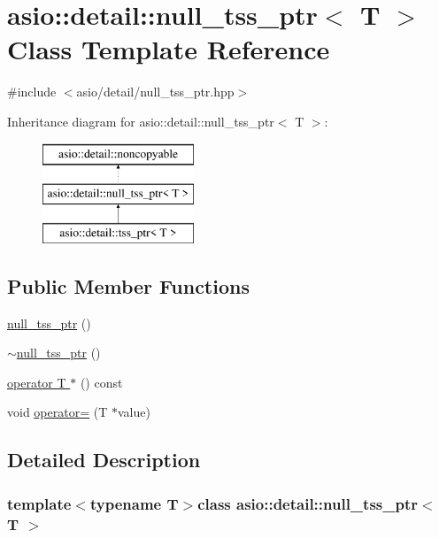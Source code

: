 \hypertarget{classasio_1_1detail_1_1null__tss__ptr}{}\section{asio\+:\+:detail\+:\+:null\+\_\+tss\+\_\+ptr$<$ T $>$ Class Template Reference}
\label{classasio_1_1detail_1_1null__tss__ptr}


{\ttfamily \#include $<$asio/detail/null\+\_\+tss\+\_\+ptr.\+hpp$>$}

Inheritance diagram for asio\+:\+:detail\+:\+:null\+\_\+tss\+\_\+ptr$<$ T $>$\+:\begin{figure}[H]
\begin{center}
\leavevmode
\includegraphics[height=3.000000cm]{classasio_1_1detail_1_1null__tss__ptr}
\end{center}
\end{figure}
\subsection*{Public Member Functions}
\begin{DoxyCompactItemize}
\item 
\hyperlink{classasio_1_1detail_1_1null__tss__ptr_ad6af39fee5cc894e72de424acf2c41f0}{null\+\_\+tss\+\_\+ptr} ()
\item 
\hyperlink{classasio_1_1detail_1_1null__tss__ptr_ac9fb3a606866c32e038dcf8d05afae5a}{$\sim$null\+\_\+tss\+\_\+ptr} ()
\item 
\hyperlink{classasio_1_1detail_1_1null__tss__ptr_aad933ac836273d1d5f1269563cba0996}{operator T $\ast$} () const 
\item 
void \hyperlink{classasio_1_1detail_1_1null__tss__ptr_a3ac0fe425745c57878a69b8ed24e146d}{operator=} (T $\ast$value)
\end{DoxyCompactItemize}


\subsection{Detailed Description}
\subsubsection*{template$<$typename T$>$class asio\+::detail\+::null\+\_\+tss\+\_\+ptr$<$ T $>$}



